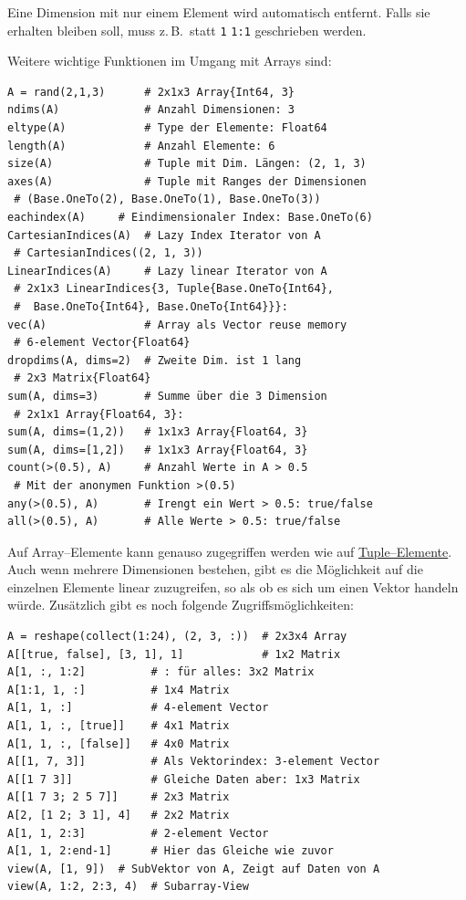 \documentclass[10pt,twocolumn]{scrartcl}
\begin{document}
Eine Dimension mit nur einem Element wird automatisch entfernt. Falls sie
erhalten bleiben soll, muss z.\,B.\ statt \lstinline|1| \lstinline|1:1|
geschrieben werden.

Weitere wichtige Funktionen im Umgang mit Arrays sind:
\begin{lstlisting}
A = rand(2,1,3)      # 2x1x3 Array{Int64, 3}
ndims(A)             # Anzahl Dimensionen: 3
eltype(A)            # Type der Elemente: Float64
length(A)            # Anzahl Elemente: 6
size(A)              # Tuple mit Dim. Längen: (2, 1, 3)
axes(A)              # Tuple mit Ranges der Dimensionen
 # (Base.OneTo(2), Base.OneTo(1), Base.OneTo(3))
eachindex(A)     # Eindimensionaler Index: Base.OneTo(6)
CartesianIndices(A)  # Lazy Index Iterator von A
 # CartesianIndices((2, 1, 3))
LinearIndices(A)     # Lazy linear Iterator von A
 # 2x1x3 LinearIndices{3, Tuple{Base.OneTo{Int64},
 #  Base.OneTo{Int64}, Base.OneTo{Int64}}}:
vec(A)               # Array als Vector reuse memory
 # 6-element Vector{Float64}
dropdims(A, dims=2)  # Zweite Dim. ist 1 lang
 # 2x3 Matrix{Float64}
sum(A, dims=3)       # Summe über die 3 Dimension
 # 2x1x1 Array{Float64, 3}:
sum(A, dims=(1,2))   # 1x1x3 Array{Float64, 3}
sum(A, dims=[1,2])   # 1x1x3 Array{Float64, 3}
count(>(0.5), A)     # Anzahl Werte in A > 0.5
 # Mit der anonymen Funktion >(0.5)
any(>(0.5), A)       # Irengt ein Wert > 0.5: true/false
all(>(0.5), A)       # Alle Werte > 0.5: true/false
\end{lstlisting}

Auf Array--Elemente kann genauso zugegriffen werden wie auf
\hyperref[ssec:tuple]{Tuple--Elemente}. Auch wenn mehrere Dimensionen bestehen,
gibt es die Möglichkeit auf die einzelnen Elemente linear zuzugreifen, so als ob
es sich um einen Vektor handeln würde. Zusätzlich gibt es noch folgende
Zugriffsmöglichkeiten:

\begin{lstlisting}
A = reshape(collect(1:24), (2, 3, :))  # 2x3x4 Array
A[[true, false], [3, 1], 1]            # 1x2 Matrix
A[1, :, 1:2]          # : für alles: 3x2 Matrix
A[1:1, 1, :]          # 1x4 Matrix
A[1, 1, :]            # 4-element Vector
A[1, 1, :, [true]]    # 4x1 Matrix
A[1, 1, :, [false]]   # 4x0 Matrix
A[[1, 7, 3]]          # Als Vektorindex: 3-element Vector
A[[1 7 3]]            # Gleiche Daten aber: 1x3 Matrix
A[[1 7 3; 2 5 7]]     # 2x3 Matrix
A[2, [1 2; 3 1], 4]   # 2x2 Matrix
A[1, 1, 2:3]          # 2-element Vector
A[1, 1, 2:end-1]      # Hier das Gleiche wie zuvor
view(A, [1, 9])  # SubVektor von A, Zeigt auf Daten von A
view(A, 1:2, 2:3, 4)  # Subarray-View
\end{lstlisting}
\end{document}
